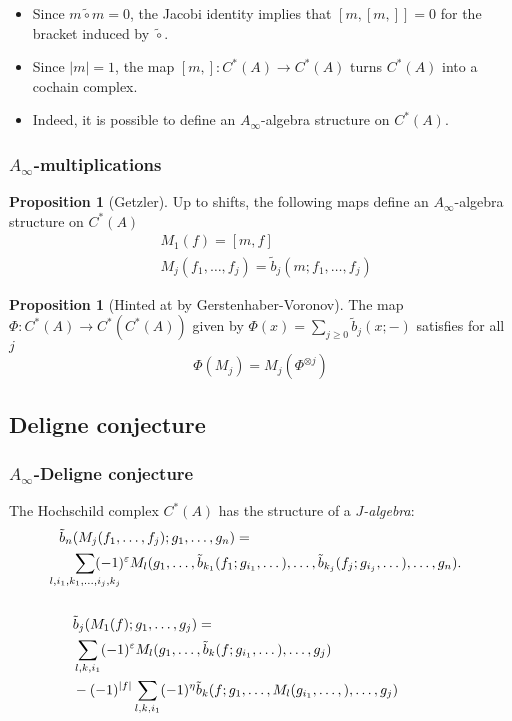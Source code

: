 \documentclass{beamer}
\theoremstyle{definition}
\newtheorem{prop}[theo]{Proposition}
\begin{document}
\begin{frame}
\begin{itemize}
\item<1-> Since $m\tilde{\circ}m=0$, the Jacobi identity implies that $[m,[m,]]=0$ for the bracket induced by $\tilde{\circ}$.
\item<2-> Since $|m|=1$, the map $[m,]:C^*(A)\to C^*(A)$ turns $C^*(A)$ into a cochain complex.
\item<3-> Indeed, it is possible to define an $A_\infty$-algebra structure on $C^*(A)$. %
\end{itemize}
\end{frame}
\begin{frame}
\frametitle{$A_\infty$-multiplications}
\begin{prop}[Getzler]
Up to shifts, the following maps define an $A_\infty$-algebra structure on $C^*(A)$
\begin{align*}
&M_1(f)=[m,f]\\
&M_j(f_1,\dots, f_j)=\tilde{b}_j(m;f_1,\dots, f_j) %
\end{align*}
\end{prop}\pause

\begin{prop}[Hinted at by Gerstenhaber-Voronov]
The map $\Phi:C^*(A)\to C^*(C^*(A))$ given by $\Phi(x)= \sum_{j\geq 0} \tilde{b}_j(x;-)$ satisfies for all $j$
\[\Phi(M_j) = M_j(\Phi^{\otimes j})\]
\end{prop}
\end{frame}


\subsection{Deligne conjecture}
\begin{frame}
\frametitle{$A_\infty$-Deligne conjecture}
\begin{theorem} %
The Hochschild complex $C^*(A)$ has the structure of a \emph{$J$-algebra}:
\begin{align*}
\tilde{b}_n&(M_j(f_1,\dots, f_j);g_1,\dots, g_n)=\\
&\sum_{\mathclap{l,i_1,k_1,\dots, i_j,k_j}}(-1)^{\varepsilon}M_l(g_1,\dots, \tilde{b}_{k_1}(f_1;g_{i_1},\dots),\dots, \tilde{b}_{k_j}(f_j;g_{i_j},\dots),\dots, g_n).\\ 
\\
&\tilde{b}_j(M_1(f);g_1,\dots, g_j)=\\
&\sum_{l,k,i_1}(-1)^{\varepsilon}M_l(g_1,\dots, \tilde{b}_{k}(f;g_{i_1},\dots),\dots, g_j)\\
&-(-1)^{|f|}\sum_{l,k,i_1} (-1)^{\eta} \tilde{b}_k(f;g_1,\dots, M_l(g_{i_1},\dots,), \dots, g_j)
\end{align*}
\end{theorem}
\end{frame}
\end{document}
